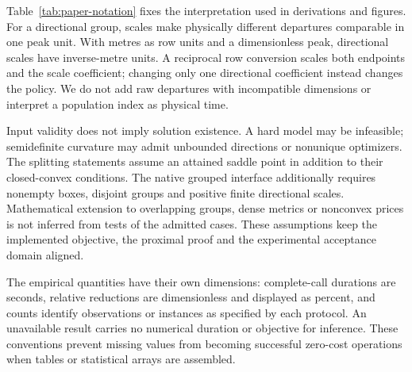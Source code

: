 Table~\ref{tab:paper-notation} fixes the interpretation used in derivations
and figures. For a directional group, scales make physically different
departures comparable in one peak unit. With metres as row units and a
dimensionless peak, directional scales have inverse-metre units. A
reciprocal row conversion scales both endpoints and the scale coefficient;
changing only one directional coefficient instead changes the policy.
We do not add raw departures with incompatible dimensions or interpret a
population index as physical time.

Input validity does not imply solution existence. A hard model may be
infeasible; semidefinite curvature may admit unbounded directions or
nonunique optimizers. The splitting statements assume an attained saddle
point in addition to their closed-convex conditions. The native grouped
interface additionally requires nonempty boxes, disjoint groups and positive
finite directional scales. Mathematical extension to overlapping groups,
dense metrics or nonconvex prices is not inferred from tests of the
admitted cases. These assumptions keep the implemented objective, the
proximal proof and the experimental acceptance domain aligned.

The empirical quantities have their own dimensions: complete-call durations
are seconds, relative reductions are dimensionless and displayed as percent,
and counts identify observations or instances as specified by each protocol.
An unavailable result carries no numerical duration or objective for inference.
These conventions prevent missing values from becoming successful zero-cost
operations when tables or statistical arrays are assembled.
